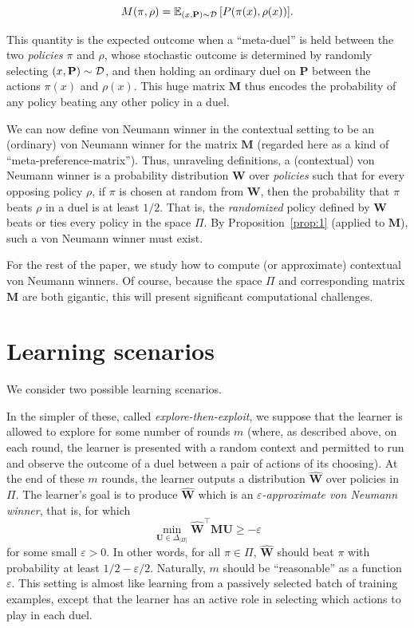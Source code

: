 \begin{equation}  \label{eq:f6}
  {M({\pi},{\rho})} = {\mathbb{E}_{(x,\mathbf{P})\sim{\cal D}}\left[{{P({\pi(x)},{\rho(x)})}}\right]}.
\end{equation}

This quantity is the expected outcome when a ``meta-duel'' is held between the two {\em policies} $\pi$ and $\rho$,
whose stochastic outcome is determined by randomly selecting $(x,\mathbf{P})\sim{\cal D}$, and then holding an ordinary duel on $\mathbf{P}$ between the actions $\pi(x)$ and $\rho(x)$.
This huge matrix $\mathbf{M}$ thus encodes the probability of any policy beating any other policy in a duel.

We can now define von Neumann winner in the contextual setting to be an (ordinary) von Neumann winner for the matrix $\mathbf{M}$
(regarded here as a kind of ``meta-preference-matrix''). Thus, unraveling definitions, a (contextual) von Neumann winner is a probability distribution $\mathbf{W}$
over \emph{policies} such that for every opposing policy $\rho$,
if $\pi$ is chosen at random from
$\mathbf{W}$, then the probability that $\pi$ beats $\rho$
in a duel is at least $1/2$. That is, the {\em randomized\/} policy defined by $\mathbf{W}$ beats or ties every policy in the space $\Pi$.
By Proposition~\ref{prop:1}
(applied to $\mathbf{M}$), such a von Neumann winner must exist.

For the rest of the paper, we study how to compute (or approximate) contextual von Neumann winners. Of course, because the space $\Pi$ and corresponding matrix $\mathbf{M}$
are both gigantic, this will present significant computational challenges.

\section{Learning scenarios}
\label{sec:scenarios}

We consider two possible learning scenarios.

In the simpler of these, called {\em explore-then-exploit}, we suppose that the learner is allowed to explore for some number of rounds $m$ (where, as described above, on each round, the learner is presented with a random context and permitted to run and observe the outcome of a duel between a pair of actions of its choosing). At the end of these $m$ rounds, the learner outputs a distribution
$\mathbf{\hat{W}}$ over policies in $\Pi$.
The learner's goal is to produce $\mathbf{\hat{W}}$ which is an
{\em $\varepsilon$-approximate von Neumann winner}, that is, for which
\[
  \min_{\mathbf{U}\in{\Delta_{{|\Pi|}}}} {\mathbf{\hat{W}}^{\top}} \mathbf{M} \mathbf{U} \geq -\varepsilon
\]
for some small $\varepsilon>0$.
In other words, for all $\pi\in\Pi$, $\mathbf{\hat{W}}$ should beat $\pi$ with probability at least $1/2-\varepsilon/2$.
Naturally, $m$ should be ``reasonable'' as a function
$\varepsilon$.
This setting is almost like learning from a passively selected batch of training examples, except that the learner has an active role in selecting which actions to play in each duel.

